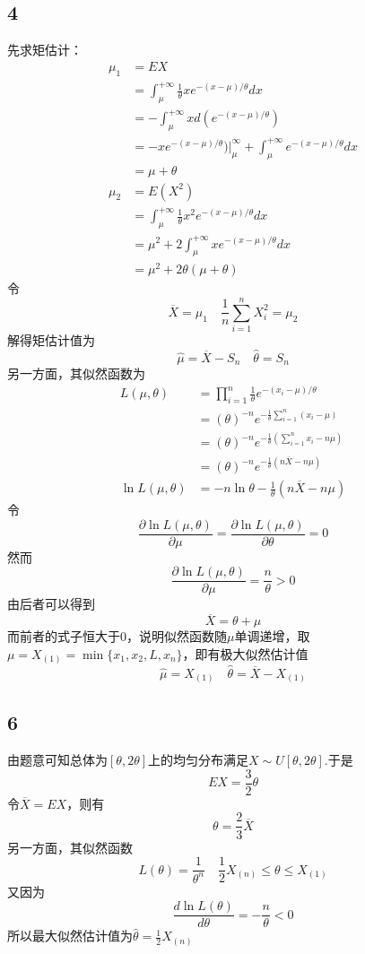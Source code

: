 \documentclass[twocolumn]{article}
\begin{document}
\begin{CJK}{UTF8}{gbsn}
			\subsection*{4}
				先求矩估计：\begin{align*}
					\mu_1 & = EX\\
					& = \int_{\mu}^{+\infty}\frac{1}{\theta}xe^{-(x-\mu)/\theta}dx\\
					& = -\int_{\mu}^{+\infty}xd(e^{-(x-\mu)/\theta})\\
					& = -xe^{-(x-\mu)/\theta})|_\mu^\infty + \int_{\mu}^{+\infty}e^{-(x-\mu)/\theta}dx\\
					& = \mu+\theta\\
					\mu_2 & = E(X^2)\\
					& = \int_{\mu}^{+\infty}\frac{1}{\theta}x^2e^{-(x-\mu)/\theta}dx\\
					& = \mu^2+2\int_{\mu}^{+\infty}xe^{-(x-\mu)/\theta}dx\\
					& = \mu^2+2\theta(\mu+\theta)
				\end{align*}
				令\[\overline{X}=\mu_1\quad \frac{1}{n}\sum_{i=1}^{n}X_i^2=\mu_2\]解得矩估计值为\[\hat{\mu}=\overline{X}-S_n\quad\hat{\theta}=S_n\]
				另一方面，其似然函数为\begin{align*}
					L(\mu,\theta) & = \prod_{i=1}^{n}\frac{1}{\theta}e^{-(x_i-\mu)/\theta}\\
					& = (\theta)^{-n}e^{-\frac{1}{\theta}\sum_{i=1}^{n}(x_i-\mu)}\\
					& = (\theta)^{-n}e^{-\frac{1}{\theta}(\sum_{i=1}^{n}x_i-n\mu)}\\
					& = (\theta)^{-n}e^{-\frac{1}{\theta}(n\overline{X}-n\mu)}\\
					\ln L(\mu,\theta) & = -n\ln\theta-\frac{1}{\theta}(n\overline{X}-n\mu)
				\end{align*}
				令\[\frac{\partial\ln L(\mu,\theta)}{\partial\mu}=\frac{\partial\ln L(\mu,\theta)}{\partial\theta}=0\]然而\[\frac{\partial\ln L(\mu,\theta)}{\partial\mu}=\frac{n}{\theta}>0\]由后者可以得到\[\overline{X}=\theta+\mu\]而前者的式子恒大于0，说明似然函数随$\mu$单调递增，取$\mu=X_{(1)}=\min\{x_1,x_2,L,x_n\}$，即有极大似然估计值\[\hat{\mu}=X_{(1)}\quad\hat{\theta}=\overline{X}-X_{(1)}\]
			\subsection*{6}
				由题意可知总体为$[\theta,2\theta]$上的均匀分布满足$X\sim U[\theta,2\theta]$.于是\[EX=\frac{3}{2}\theta\]令$\overline{X}=EX$，则有\[\theta=\frac{2}{3}\overline{X}\]另一方面，其似然函数\[L(\theta)=\frac{1}{\theta^n}\quad\frac{1}{2}X_{(n)}\le\theta\le X_{(1)}\]又因为\[\frac{d\ln L(\theta)}{d\theta}=-\frac{n}{\theta}<0\]所以最大似然估计值为$\hat{\theta}=\frac{1}{2}X_{(n)}$

\end{CJK}
\end{document}
